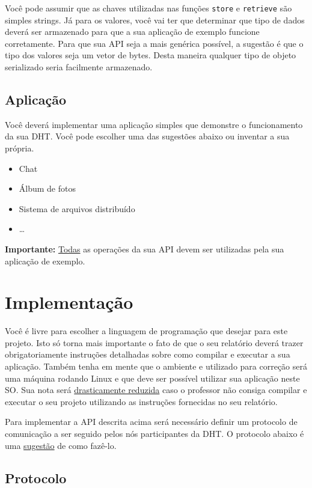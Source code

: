 \documentclass[oneside,12pt,a4paper]{article}
\begin{document}
Você pode assumir que as chaves utilizadas nas funções \texttt{store}
e \texttt{retrieve} são simples strings. Já para os valores, você vai
ter que determinar que tipo de dados deverá ser armazenado para que a
sua aplicação de exemplo funcione corretamente. Para que sua API seja
a mais genérica possível, a sugestão é que o tipo dos valores seja um
vetor de bytes. Desta maneira qualquer tipo de objeto serializado
seria facilmente armazenado.


\subsection{Aplicação}

Você deverá implementar uma aplicação simples que demonstre o
funcionamento da sua DHT. Você pode escolher uma das sugestões abaixo
ou inventar a sua própria.

\begin{itemize}
\item Chat
\item Álbum de fotos
\item Sistema de arquivos distribuído
\item \ldots
\end{itemize}

\textbf{Importante:} \underline{Todas} as operações da sua API devem
ser utilizadas pela sua aplicação de exemplo.

\section{Implementação}

Você é livre para escolher a linguagem de programação que desejar para
este projeto. Isto só torna mais importante o fato de que o seu
relatório deverá trazer obrigatoriamente instruções detalhadas sobre
como compilar e executar a sua aplicação. Também tenha em mente que o
ambiente e utilizado para correção será uma máquina rodando Linux e
que deve ser possível utilizar sua aplicação neste SO. Sua nota será
\underline{drasticamente reduzida} caso o professor não consiga
compilar e executar o seu projeto utilizando as instruções fornecidas
no seu relatório.

Para implementar a API descrita acima será necessário definir um
protocolo de comunicação a ser seguido pelos nós participantes da
DHT. O protocolo abaixo é uma \underline{sugestão} de como fazê-lo.

\subsection{Protocolo}
\end{document}

